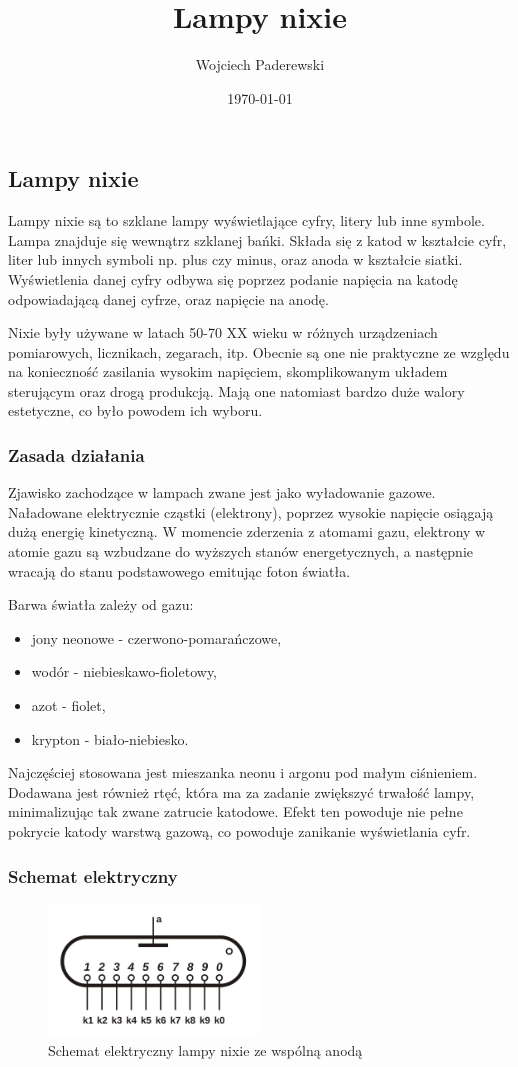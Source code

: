 \documentclass[../main.tex]{subfiles}
\author{Wojciech Paderewski}
\date{\today}
\title{Lampy nixie}
\begin{document}
\subsection{Lampy nixie}
Lampy nixie są to szklane lampy wyświetlające cyfry, litery lub inne symbole.
Lampa znajduje się wewnątrz szklanej bańki. Składa się z katod w kształcie cyfr, liter lub innych symboli np. plus czy minus, oraz anoda w kształcie siatki.
Wyświetlenia danej cyfry odbywa się poprzez podanie napięcia na katodę odpowiadającą danej cyfrze, oraz napięcie na anodę.

Nixie były używane w latach 50-70 XX wieku w różnych urządzeniach pomiarowych, licznikach, zegarach, itp. 
Obecnie są one nie praktyczne ze względu na konieczność zasilania wysokim napięciem, skomplikowanym układem sterującym oraz drogą produkcją.
Mają one natomiast bardzo duże walory estetyczne, co było powodem ich wyboru.

\subsubsection{Zasada działania}
Zjawisko zachodzące w lampach zwane jest jako wyładowanie gazowe.
Naładowane elektrycznie cząstki (elektrony), poprzez wysokie napięcie osiągają dużą energię kinetyczną.
W momencie zderzenia z atomami gazu, elektrony w atomie gazu są wzbudzane do wyższych stanów energetycznych, a następnie wracają do stanu podstawowego emitując foton światła.

Barwa światła zależy od gazu:
\begin{itemize}
  \item jony neonowe - czerwono-pomarańczowe,
  \item wodór - niebieskawo-fioletowy,
  \item azot - fiolet,
  \item krypton - biało-niebiesko.
\end{itemize}

Najczęściej stosowana jest mieszanka neonu i argonu pod małym ciśnieniem. Dodawana jest również rtęć, która ma za zadanie zwiększyć trwałość lampy, 
minimalizując tak zwane zatrucie katodowe. Efekt ten powoduje nie pełne pokrycie katody warstwą gazową, co powoduje zanikanie wyświetlania cyfr.

\subsubsection{Schemat elektryczny}
\begin{figure}[H]
  \centering
  \includegraphics[width=0.5\textwidth]{Nixie_schematic.png}
  \caption{Schemat elektryczny lampy nixie ze wspólną anodą}
\end{figure}
\end{document}
